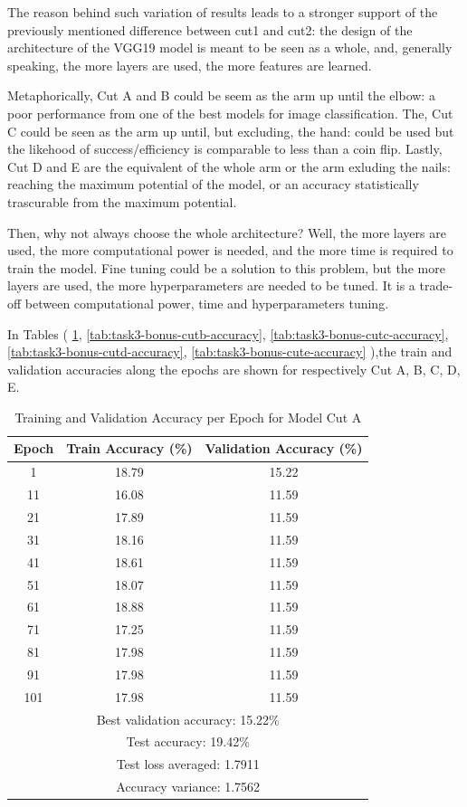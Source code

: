\documentclass[11pt]{scrartcl}
\begin{document}
The reason behind such variation of results leads to a stronger 
support of the previously mentioned difference between cut1 and cut2:
the design of the architecture of the VGG19 model is meant to be seen as a whole,
and, generally speaking, the more layers are used, the more features are learned.

Metaphorically, Cut A and B could be seem as the arm up until the elbow:
a poor performance from one of the best models for image classification.
The, Cut C could be seen as the arm up until, but excluding, the hand:
could be used but the likehood of success/efficiency is comparable to less
than a coin flip. 
Lastly, Cut D and E are the equivalent of the whole arm or the arm exluding the nails:
reaching the maximum potential of the model,
or an accuracy statistically trascurable from the maximum potential. 

Then, why not always choose the whole architecture?	
Well, the more layers are used, the more computational power is needed,
and the more time is required to train the model.
Fine tuning could be a solution to this problem,
but the more layers are used, the more hyperparameters are needed to be tuned.
It is a trade-off between computational power, time and hyperparameters tuning.

In Tables (
	\ref{tab:task3-bonus-cuta-accuracy},
	\ref{tab:task3-bonus-cutb-accuracy},
	\ref{tab:task3-bonus-cutc-accuracy},
	\ref{tab:task3-bonus-cutd-accuracy},
	\ref{tab:task3-bonus-cute-accuracy}
),the train and validation accuracies along the epochs are shown 
for respectively
Cut A, B, C, D, E.

\begin{table}[htbp]
\centering
\caption{Training and Validation Accuracy per Epoch for Model Cut A}
\begin{tabular}{ccc}
\toprule
\textbf{Epoch} & \textbf{Train Accuracy (\%)} & \textbf{Validation Accuracy (\%)} \\
\midrule
1    & 18.79  & 15.22 \\
11   & 16.08  & 11.59 \\
21   & 17.89  & 11.59 \\
31   & 18.16  & 11.59 \\
41   & 18.61  & 11.59 \\
51   & 18.07  & 11.59 \\
61   & 18.88  & 11.59 \\
71   & 17.25  & 11.59 \\
81   & 17.98  & 11.59 \\
91   & 17.98  & 11.59 \\
101  & 17.98  & 11.59 \\
\midrule
\multicolumn{3}{c}{Best validation accuracy: 15.22\%} \\
\midrule
\multicolumn{3}{c}{Test accuracy: 19.42\%} \\
\multicolumn{3}{c}{Test loss averaged: 1.7911} \\
\multicolumn{3}{c}{Accuracy variance: 1.7562} \\
\bottomrule
\end{tabular}
\label{tab:task3-bonus-cuta-accuracy}
\end{table}
\end{document}
